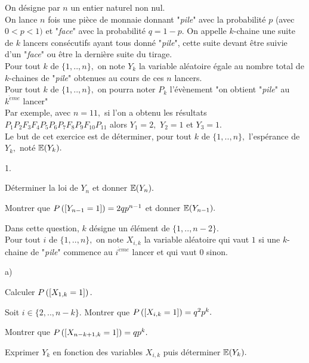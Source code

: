 \documentclass[11pt]{article}%
\begin{document}
On désigne par $n$ un entier naturel non nul.\\
On lance $n$ fois une pièce de monnaie donnant "\textsl{pile}" avec la
probabilité $p$ (avec $0<p<1)$ et "\textsl{face}" avec la probabilité
$q = 1-p.
$ On appelle $k$-chaine une suite de $k$ lancers consécutifs ayant tous
donné
"\textsl{pile}", cette suite devant être suivie d'un "\textsl{face}" ou
être
la dernière suite du tirage.\\
Pour tout $k$ de $\{1,..,n\},$ on note $Y_{k}$ la variable aléatoire
égale
au nombre total de $k$-chaines de "\textsl{pile}" obtenues au cours de
ces $n
$ lancers.\\
Pour tout $k$ de $\{1,..,n\},$ on pourra noter $P_{k}$ l'évènement "on
obtient "\textsl{pile}" au $k^{\grave{e}me}$ lancer"\\
Par exemple, avec $n = 11,$ si l'on a obtenu les résultats $
P_{1}P_{2}F_{3}F_{4}P_{5}P_{6}P_{7}F_{8}P_{9}F_{10}P_{11}$ alors $Y_{1}
= 2,$ $
Y_{2} = 1$ et $Y_{3} = 1.$\\
Le but de cet exercice est de déterminer, pour tout $k$ de
$\{1,..,n\},$
l'espérance de $Y_{k},$ noté $\mathbb{E}(Y_{k}).$

\begin{noliste}{1.}
 \setlength{\itemsep}{4mm}
\item Déterminer la loi de $Y_{n}$ et donner $\mathbb{E}(Y_{n}).$

\item Montrer que $P\left(\left[ {Y_{n-1} = 1} \right]\right) = 2qp^{n-1}$ et
donner $\mathbb{E}(Y_{n-1}).$

\item Dans cette question, $k$ désigne un élément de $\{1,..,n-2\}.$\\
Pour tout $i$ de $\{1,..,n\},$ on note $X_{i,k}$ la variable aléatoire
qui
vaut $1$ si une $k$-chaine de "\textsl{pile}" commence au
$i^{\grave{e}me}$
lancer et qui vaut $0$ sinon.

\begin{noliste}{a)}
 \setlength{\itemsep}{2mm}
\item Calculer $P\left(\left[ {X_{1,k} = 1} \right]\right).$

\item Soit $i\in \{2,..,n-k\}.$ Montrer que $P\left(\left[ {X_{i,k} =
1} \right]\right) = q^{2}p^{k}.$

\item Montrer que $P\left(\left[ {X_{n-k + 1,k} = 1} \right]\right) = qp^{k}.$

\item Exprimer $Y_{k}$ en fonction des variables $X_{i,k}$ puis
déterminer $\mathbb{E}(Y_{k}).$\vspace{1cm}
\end{noliste}
\end{noliste}
\end{document}
